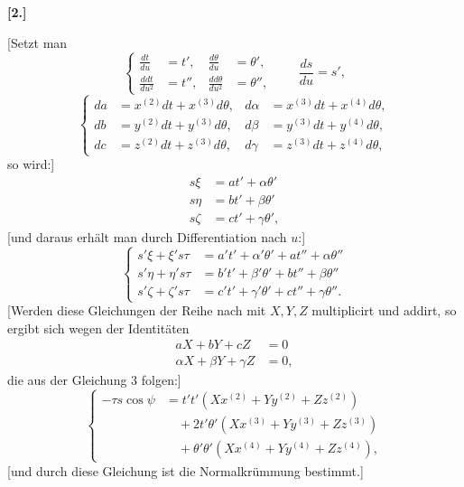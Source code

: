 %
\begin{center}\bfseries [2.]\end{center}
\noindent\hspace*{1.2em}[Setzt man
\begin{equation}\tag*{[10]}
\left\{\begin{aligned}
\frac{dt}{du}&=t',&\frac{d\theta}{du}&=\theta',\\
\frac{ddt}{du^2}&=t'',&\frac{dd\theta}{du^2}&=\theta'',
\end{aligned}\right.\qquad \frac{ds}{du}=s',
\end{equation}
\begin{equation}\tag*{[11]}
\left\{\begin{aligned}
da&=x^{(2)}dt+x^{(3)}d\theta,&d\alpha&=x^{(3)}dt+x^{(4)}d\theta,\\
db&=y^{(2)}dt+y^{(3)}d\theta,&d\beta&=y^{(3)}dt+y^{(4)}d\theta,\\
dc&=z^{(2)}dt+z^{(3)}d\theta,&d\gamma&=z^{(3)}dt+z^{(4)}d\theta,
\end{aligned}\right.
\end{equation}
so wird:]
\[
\begin{aligned}
s\xi&=at'+\alpha\theta'\\
s\eta&=bt'+\beta\theta'\\
s\zeta&=ct'+\gamma\theta',
\end{aligned}
\]
[und daraus erhält man durch Differentiation nach $u$:]
\begin{equation}\tag*{[12]}
\left\{\begin{aligned}
s'\xi+\xi's\tau&=a't'+\alpha'\theta'+at''+\alpha\theta''\\
s'\eta+\eta's\tau&=b't'+\beta'\theta'+bt''+\beta\theta''\\
s'\zeta+\zeta's\tau&=c't'+\gamma'\theta'+ct''+\gamma\theta''.
\end{aligned}\right.
\end{equation}
[Werden diese Gleichungen der Reihe nach mit $X,Y,Z$ multiplicirt und addirt, so ergibt sich wegen der Identitäten
\[
\begin{aligned}
aX+bY+cZ&=0\\
\alpha X+\beta Y+\gamma Z&=0,
\end{aligned}
\]
die aus der Gleichung 3 folgen:]
\begin{equation}\tag*{[13]}
\left\{\begin{aligned}
-\tau s\cos\psi&=t't'(Xx^{(2)}+Yy^{(2)}+Zz^{(2)})\\
&\quad+2t'\theta'(Xx^{(3)}+Yy^{(3)}+Zz^{(3)})\\
&\quad+\theta'\theta'(Xx^{(4)}+Yy^{(4)}+Zz^{(4)}),
\end{aligned}\right.
\end{equation}
[und durch diese Gleichung ist die Normalkrümmung bestimmt.]
